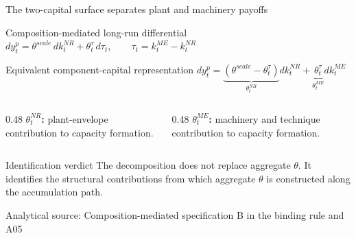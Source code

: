 \documentclass[10pt,aspectratio=169]{beamer}
\newcommand{\sourcefooter}[1]{%
  \par\vfill{\tiny\color{gray!70}Analytical source: #1}\vspace{-0.35em}}
\begin{document}
\begin{frame}{The two-capital surface separates plant and machinery payoffs}
  \begin{block}{Composition-mediated long-run differential}
    \centering
    \Large
    $\displaystyle
    d y_t^p
    =\theta^{scale}\,d k_t^{NR}
    +\theta_t^{\tau}\,d\tau_t,
    \qquad
    \tau_t=k_t^{ME}-k_t^{NR}$
  \end{block}

  \begin{block}{Equivalent component-capital representation}
    \centering
    \Large
    $\displaystyle
    d y_t^p
    =\underbrace{(\theta^{scale}-\theta_t^{\tau})}_{\theta_t^{NR}}d k_t^{NR}
    +\underbrace{\theta_t^{\tau}}_{\theta_t^{ME}}d k_t^{ME}$
  \end{block}

  \begin{columns}[T,onlytextwidth]
    \begin{column}{0.48\textwidth}
      \small\textbf{$\theta_t^{NR}$:} plant-envelope contribution to capacity formation.
    \end{column}
    \begin{column}{0.48\textwidth}
      \small\textbf{$\theta_t^{ME}$:} machinery and technique contribution to capacity formation.
    \end{column}
  \end{columns}
  \begin{alertblock}{Identification verdict}
    The decomposition does not replace aggregate $\theta$. It identifies the structural contributions from which aggregate $\theta$ is constructed along the accumulation path.
  \end{alertblock}
  \sourcefooter{Composition-mediated specification B in the binding rule and A05}
\end{frame}
\end{document}
